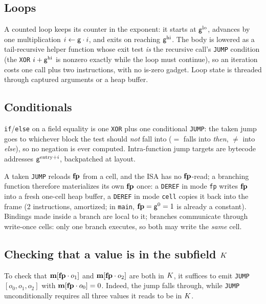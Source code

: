 \subsection{Loops}\label{sec:prog-loops}

A counted loop keeps its counter in the exponent: it starts at $\mathsf{g}^{\mathrm{lo}}$, advances by one multiplication $i\gets\mathsf{g}\cdot i$, and exits on reaching $\mathsf{g}^{\mathrm{hi}}$. The body is lowered as a tail-recursive helper function whose exit test \emph{is} the recursive call's \texttt{JUMP} condition (the \texttt{XOR} $i+\mathsf{g}^{\mathrm{hi}}$ is nonzero exactly while the loop must continue), so an iteration costs one call plus two instructions, with no is-zero gadget. Loop state is threaded through captured arguments or a heap buffer.

\subsection{Conditionals}\label{sec:prog-conditionals}

\texttt{if}/\texttt{else} on a field equality is one \texttt{XOR} plus one conditional \texttt{JUMP}: the taken jump goes to whichever block the test should \emph{not} fall into ($=$ falls into \emph{then}, $\neq$ into \emph{else}), so no negation is ever computed. Intra-function jump targets are bytecode addresses $\mathsf{g}^{\mathrm{entry}+i}$, backpatched at layout.

A taken \texttt{JUMP} reloads $\mathbf{fp}$ from a cell, and the ISA has no $\mathbf{fp}$-read; a branching function therefore materializes its own $\mathbf{fp}$ once: a \texttt{DEREF} in mode \texttt{fp} writes $\mathbf{fp}$ into a fresh one-cell heap buffer, a \texttt{DEREF} in mode \texttt{cell} copies it back into the frame (2 instructions, amortized; in \texttt{main}, $\mathbf{fp}=\mathsf{g}^{0}=1$ is already a constant). Bindings made inside a branch are local to it; branches communicate through write-once cells: only one branch executes, so both may write the \emph{same} cell.

\subsection{Checking that a value is in the subfield \texorpdfstring{$K$}{K}}\label{sec:prog-subfield-checks}

To check that $\mathbf{m}[\mathbf{fp}\cdot o_1]$ and $\mathbf{m}[\mathbf{fp}\cdot o_2]$ are both in $K$, it suffices to emit \texttt{JUMP} $[o_0,o_1,o_2]$ with $\mathbf{m}[\mathbf{fp}\cdot o_0]=0$. Indeed, the jump falls through, while \texttt{JUMP} unconditionally requires all three values it reads to be in $K$.

